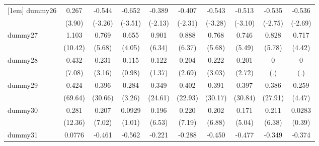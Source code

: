 {\begin{tabular}{l*{9}{c}}
[1em]
dummy26     &       0.267\sym{***}&      -0.544\sym{**} &      -0.652\sym{***}&      -0.389\sym{*}  &      -0.407\sym{*}  &      -0.543\sym{**} &      -0.513\sym{**} &      -0.535\sym{**} &      -0.536\sym{**} \\
            &      (3.90)         &     (-3.26)         &     (-3.51)         &     (-2.13)         &     (-2.31)         &     (-3.28)         &     (-3.10)         &     (-2.75)         &     (-2.69)         \\
[1em]
dummy27     &       1.103\sym{***}&       0.769\sym{***}&       0.655\sym{***}&       0.901\sym{***}&       0.888\sym{***}&       0.768\sym{***}&       0.746\sym{***}&       0.828\sym{***}&       0.717\sym{***}\\
            &     (10.42)         &      (5.68)         &      (4.05)         &      (6.34)         &      (6.37)         &      (5.68)         &      (5.49)         &      (5.78)         &      (4.42)         \\
[1em]
dummy28     &       0.432\sym{***}&       0.231\sym{**} &       0.115         &       0.122         &       0.204\sym{**} &       0.222\sym{**} &       0.201\sym{**} &           0         &           0         \\
            &      (7.08)         &      (3.16)         &      (0.98)         &      (1.37)         &      (2.69)         &      (3.03)         &      (2.72)         &         (.)         &         (.)         \\
[1em]
dummy29     &       0.424\sym{***}&       0.396\sym{***}&       0.284\sym{**} &       0.349\sym{***}&       0.402\sym{***}&       0.391\sym{***}&       0.397\sym{***}&       0.386\sym{***}&       0.259\sym{***}\\
            &     (69.64)         &     (30.66)         &      (3.26)         &     (24.61)         &     (22.93)         &     (30.17)         &     (30.84)         &     (27.91)         &      (4.47)         \\
[1em]
dummy30     &       0.281\sym{***}&       0.207\sym{***}&      0.0929         &       0.196\sym{***}&       0.220\sym{***}&       0.202\sym{***}&       0.171\sym{***}&       0.211\sym{***}&      0.0283         \\
            &     (12.36)         &      (7.02)         &      (1.01)         &      (6.53)         &      (7.19)         &      (6.88)         &      (5.04)         &      (6.38)         &      (0.39)         \\
[1em]
dummy31     &      0.0776\sym{*}  &      -0.461\sym{***}&      -0.562\sym{***}&      -0.221         &      -0.288\sym{*}  &      -0.450\sym{***}&      -0.477\sym{***}&      -0.349\sym{*}  &      -0.374\sym{*}  \\

\end{tabular}}
